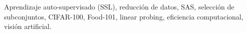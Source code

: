 \documentclass[journal,10pt,twocolumn]{IEEEtran}
\begin{document}
\begin{IEEEkeywords}
Aprendizaje auto-supervisado (SSL), reducción de datos, SAS, selección de subconjuntos, CIFAR-100, Food-101, linear probing, eficiencia computacional, visión artificial.
\end{IEEEkeywords}










\end{document}
